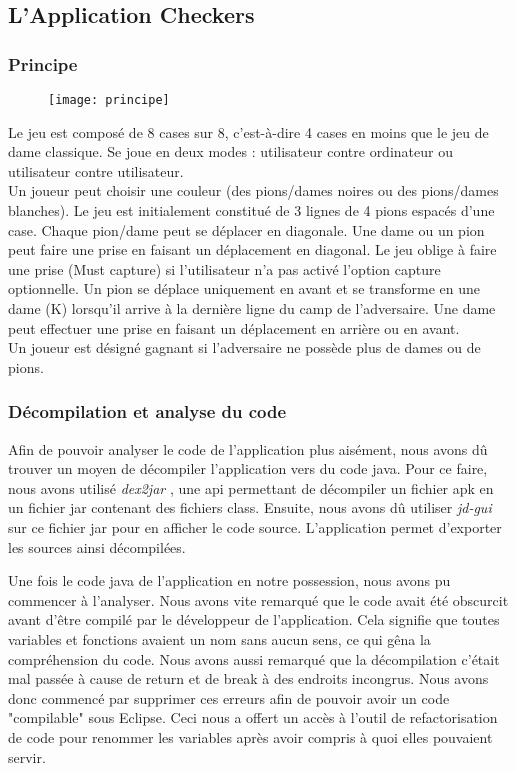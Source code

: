 
\subsection{L'Application Checkers}

\subsubsection{Principe}
\begin{figure}[hp]
	      \begin{center}
		\texttt{[image: principe]}
	      \end{center}
\end{figure}

Le jeu est composé de 8 cases sur 8, c’est-à-dire 4 cases en moins que le jeu de dame classique.  Se joue en deux modes : utilisateur contre ordinateur ou utilisateur contre utilisateur.\\
Un joueur peut choisir une couleur (des pions/dames noires ou des pions/dames blanches).  Le jeu est initialement constitué de 3 lignes de 4 pions espacés d’une case. Chaque \hbox{pion/dame} peut se déplacer en diagonale. 
Une dame ou un pion peut faire une prise en faisant un déplacement en diagonal. Le jeu oblige à faire une prise (Must capture) si l'utilisateur n'a pas activé l'option capture optionnelle. 
Un pion se déplace uniquement en avant et se transforme en une dame (K) lorsqu’il arrive à la dernière ligne du camp de l’adversaire. Une dame peut effectuer une prise en faisant un déplacement en arrière ou en avant.\\
Un joueur est désigné gagnant si l’adversaire ne possède plus de dames ou de pions.

\subsubsection{Décompilation et analyse du code}

Afin de pouvoir analyser le code de l'application plus aisément, nous avons dû trouver un moyen de décompiler l'application vers du code java.
Pour ce faire, nous avons utilisé \textit{dex2jar} \cite{dex2jar},
une api permettant de décompiler un fichier apk en un fichier jar contenant des fichiers class.
Ensuite, nous avons dû utiliser \textit{jd-gui} \cite{jdgui} sur ce fichier jar pour en afficher le code source.
L'application permet d'exporter les sources ainsi décompilées.

Une fois le code java de l'application en notre possession, nous avons pu commencer à l'analyser.
Nous avons vite remarqué que le code avait été obscurcit avant d'être compilé par le développeur de l'application.
Cela signifie que toutes variables et fonctions avaient un nom sans aucun sens, ce qui gêna la compréhension du code.
Nous avons aussi remarqué que la décompilation c'était mal passée à cause de return et de break à des endroits incongrus.
Nous avons donc commencé par supprimer ces erreurs afin de pouvoir avoir un code "compilable" sous Eclipse.
Ceci nous a offert un accès à l'outil de refactorisation de code pour renommer les variables après avoir compris à quoi elles pouvaient servir.

